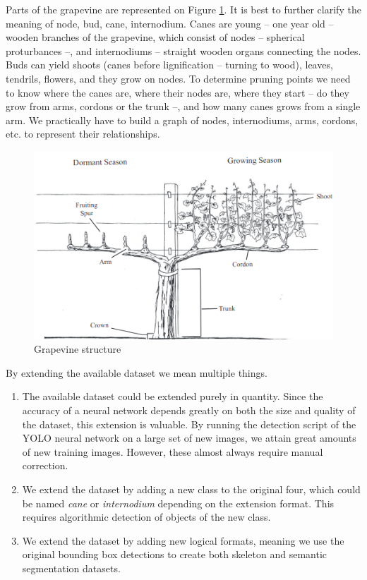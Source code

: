 \documentclass{PSAIE}%
\begin{document}
Parts of the grapevine are represented on Figure \ref{fig_grapevine_structure}. It is best to further clarify
the meaning of node, bud, cane, internodium. Canes are young -- one year old -- wooden branches of the
grapevine, which consist of nodes -- spherical proturbances --, and internodiums -- straight wooden organs
connecting the nodes. Buds can yield shoots (canes before lignification -- turning to wood), leaves, tendrils,
flowers, and they grow on nodes. To determine pruning points we need to know where the canes are, where their
nodes are, where they start -- do they grow from arms, cordons or the trunk --, and how many canes grows from
a single arm. We practically have to build a graph of nodes, internodiums, arms, cordons, etc. to represent
their relationships.

\begin{figure}[h]
      \centering
      \includegraphics[scale=0.7]{images/grapevine_structure.png}
      \caption{Grapevine structure \cite{hellman2003grapevine}}
      \label{fig_grapevine_structure}
\end{figure}

By extending the available dataset we mean multiple things.
\begin{enumerate}
      \item The available dataset could be extended purely in quantity. Since the accuracy of a neural network
            depends greatly on both the size and quality of the dataset, this extension is valuable.
            By running the detection script of the YOLO neural network on a large set of new images,
            we attain great amounts of new training images. However, these almost always require
            manual correction.
      \item We extend the dataset by adding a new class to the original four, which could be named \textit{cane}
            or \textit{internodium} depending on the extension format. This requires algorithmic detection of
            objects of the new class.
      \item We extend the dataset by adding new logical formats, meaning we use the original bounding box
            detections to create both skeleton and semantic segmentation datasets.
\end{enumerate}
\end{document}
